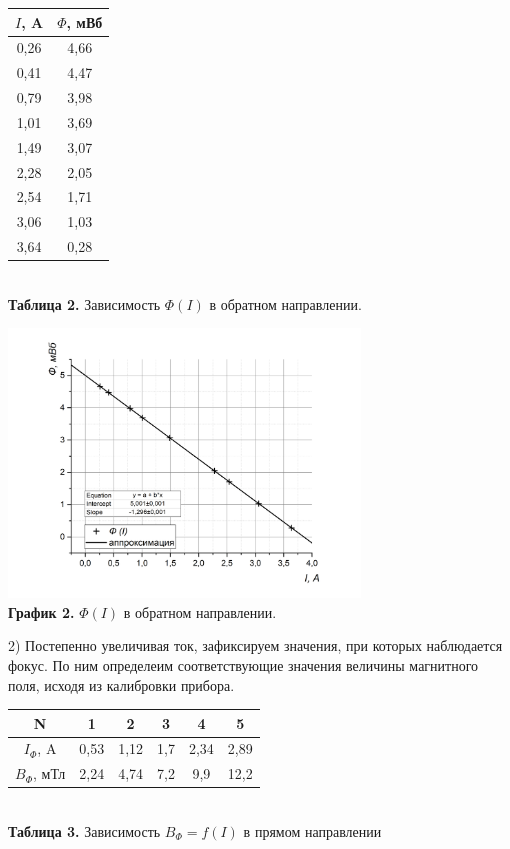 \documentclass{article}
\begin{document}
\begin{center}
\begin{tabular}{|c|c|}
\hline
$I$, A & $\Phi$, мВб\\ \hline
0,26 & 4,66 \\ \hline
0,41 & 4,47 \\ \hline
0,79 & 3,98 \\ \hline
1,01 & 3,69 \\ \hline
1,49 & 3,07 \\ \hline
2,28 & 2,05 \\ \hline
2,54 & 1,71 \\ \hline
3,06 & 1,03 \\ \hline
3,64 & 0,28 \\ \hline
\end{tabular}\\
\textbf{Таблица 2.} Зависимость $\Phi (I)$ в обратном направлении.
\end{center} 
\begin{center}
    \includegraphics[width = 0.7\textwidth]{images/image3.png}\\
    \textbf{График 2.} $\Phi (I)$ в обратном направлении.
\end{center}

2) Постепенно увеличивая ток, зафиксируем значения, при которых наблюдается фокус. По ним определеим соответствующие значения величины магнитного поля, исходя из калибровки прибора. 

\begin{center}
    \begin{tabular}{|c|c|c|c|c|c|}
    \hline
    N   &   1   &   2   &   3   &   4   &   5  \\ \hline
    \(I_{\Phi}\), A & 0,53 & 1,12 & 1,7 & 2,34 & 2,89 \\    \hline
    \(B_{\Phi}\), мТл & 2,24 & 4,74 & 7,2 & 9,9 & 12,2 \\   \hline
    \end{tabular}
    \\
    \textbf{Таблица 3.} Зависимость \(B_{\Phi} = f(I)\) в прямом направлении
\end{center}
\end{document}
